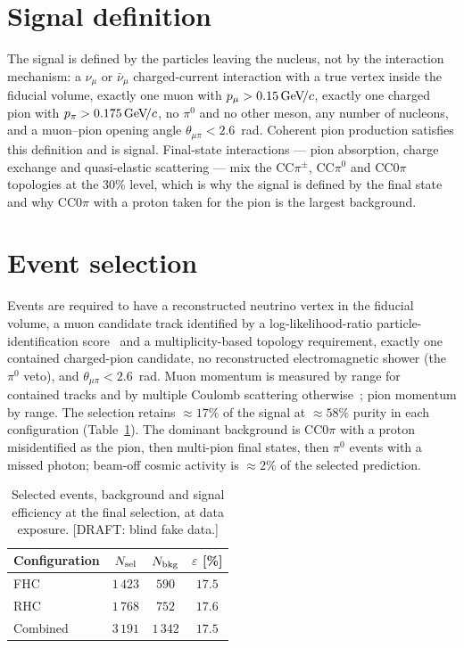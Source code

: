 \documentclass[aps,prd,twocolumn,superscriptaddress,nofootinbib,floatfix]{revtex4-2}
\begin{document}
\section{Signal definition}
\label{sec:signal}

The signal is defined by the particles leaving the nucleus, not by the interaction mechanism: a
$\nu_\mu$ or $\bar\nu_\mu$ charged-current interaction with a true vertex inside the fiducial
volume, exactly one muon with $p_\mu>0.15\,\text{GeV}\!/c$, exactly one charged pion with $p_\pi>0.175\,\text{GeV}\!/c$,
no $\pi^0$ and no other meson, any number of nucleons, and a muon--pion opening angle
$\theta_{\mu\pi}<2.6$~rad. Coherent pion production satisfies this definition and is signal.
Final-state interactions --- pion absorption, charge exchange and quasi-elastic scattering ---
mix the CC$\pi^\pm$, CC$\pi^0$ and CC$0\pi$ topologies at the $30\%$ level, which is why the
signal is defined by the final state and why CC$0\pi$ with a proton taken for the pion is the
largest background.

\section{Event selection}
\label{sec:selection}

Events are required to have a reconstructed neutrino vertex in the fiducial volume, a muon
candidate track identified by a log-likelihood-ratio particle-identification score~\cite{uboone_llr}
and a multiplicity-based topology requirement, exactly one contained charged-pion candidate, no
reconstructed electromagnetic shower (the $\pi^0$ veto), and $\theta_{\mu\pi}<2.6$~rad. Muon
momentum is measured by range for contained tracks and by multiple Coulomb scattering
otherwise~\cite{uboone_mcs}; pion momentum by range. The selection retains $\approx\!17\%$ of the
signal at $\approx\!58\%$ purity in each configuration (Table~\ref{tab:cutflow}). The dominant
background is CC$0\pi$ with a proton misidentified as the pion, then multi-pion final states, then
$\pi^0$ events with a missed photon; beam-off cosmic activity is $\approx\!2\%$ of the selected
prediction.

\begin{table}[t]
  \caption{Selected events, background and signal efficiency at the final selection, at data
    exposure. [DRAFT: blind fake data.]}
  \label{tab:cutflow}
  \begin{ruledtabular}
  \begin{tabular}{lccc}
    Configuration & $N_{\rm sel}$ & $N_{\rm bkg}$ & $\varepsilon$ [\%] \\
    \hline
    FHC & $1\,423$ & $590$ & $17.5$ \\
    RHC & $1\,768$ & $752$ & $17.6$ \\
    Combined & $3\,191$ & $1\,342$ & $17.5$ \\
  \end{tabular}
  \end{ruledtabular}
\end{table}
\end{document}
